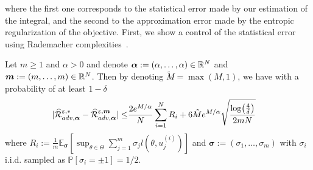 where the first one corresponds to the statistical error made by our estimation of the integral, and the second to the approximation error made by the entropic regularization of the objective. First, we show a control of the statistical error using Rademacher complexities~\citep{bartlett2002rademacher}. %
\begin{prop}
\label{prop:control-error-stat}
Let $m\geq 1$ and $\alpha>0$ and denote $\bm{\alpha}:=(\alpha,\dots,\alpha)\in\mathbb{R}^N$ and $\bm{m}:=(m,\dots,m)\in\mathbb{R}^N$.  \textcolor{black}{Then by denoting $\tilde{M}=\max(M,1)$}, we have with a probability of at least $1-\delta$
\begin{align*}
|\widehat{\mathcal{R}}_{adv,\bm{\alpha}}^{\varepsilon,*} - \widehat{\mathcal{R}}_{adv,\bm{\alpha}}^{\varepsilon,\bm{m}}|\leq& \frac{2e^{M/\alpha}}{N}\sum_{i=1}^N R_i + \color{black}{6\tilde{M}}\color{black}e^{M/\alpha}\sqrt{\frac{\log(\frac4\delta)}{2mN}}
\end{align*}
where $R_i:=\frac{1}{m}\mathbb{E}_{\bm{\sigma}}\left[\sup_{\theta\in\Theta}\sum_{j=1}^m \sigma_j l(\theta,u_j^{(i)})\right]$ and $\bm{\sigma}:=(\sigma_1,\dots,\sigma_m)$ with $\sigma_i$ i.i.d. sampled as $\mathbb{P}[\sigma_i=\pm1]=1/2$.
\end{prop}

